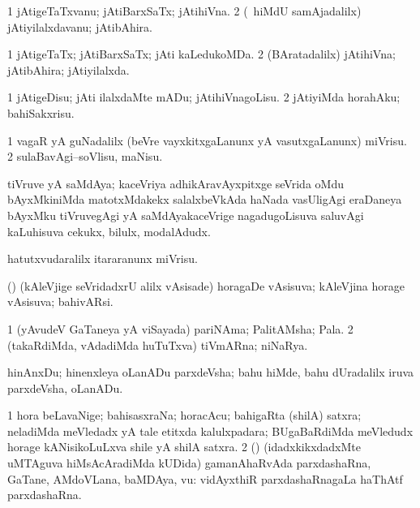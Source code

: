 \bentry
{}
\gl{\nA}
\bmng
\bnum
\num{1} jAtigeTaTxvanu; jAtiBarxSaTx; jAtihiVna. 
\num{2} (\kanmu\ hiMdU samAjadalilx) jAtiyilalxdavanu; jAtibAhira. 
\enum
\emng
\eentry

\bentry
{}
\gl{\gu}
\bmng
\bnum
\num{1} jAtigeTaTx; jAtiBarxSaTx; jAti kaLedukoMDa. 
\num{2} (BAratadalilx) jAtihiVna; jAtibAhira; jAtiyilalxda. 
\enum
\emng
\eentry

\bentry
{}
\gl{\sakirx}
\bmng
\bnum
\num{1} jAtigeDisu; jAti ilalxdaMte mADu; jAtihiVnagoLisu. 
\num{2} jAtiyiMda horahAku; bahiSakxrisu. 
\enum
\emng
\eentry

\bentry
{}
\gl{\sakirx}
\bmng
\bnum
\num{1} vagaR yA guNadalilx (beVre vayxkitxgaLanunx yA vasutxgaLanunx) miVrisu. 
\num{2} sulaBavAgi--soVlisu, maNisu. 
\enum
\emng
\eentry

\bentry
{}
\gl{\nA}
\bmng
tiVruve yA saMdAya; kaceVriya adhikAravAyxpitxge seVrida oMdu bAyxMkiniMda matotxMdakekx salalxbeVkAda haNada vasUligAgi eraDaneya bAyxMku tiVruvegAgi yA saMdAyakaceVrige nagadugoLisuva saluvAgi kaLuhisuva cekukx, bilulx, modalAdudx. 
\emng
\eentry

\bentry
{}
\gl{\sakirx}
\bmng
hatutxvudaralilx itararanunx miVrisu. 
\emng
\eentry

\bentry
{}
\gl{\gu}
\bmng
(\birx) (kAleVjige seVridadxrU alilx vAsisade) horagaDe vAsisuva; kAleVjina horage vAsisuva; bahivARsi. 
\emng
\eentry

\bentry
{}
\gl{\nA}
\bmng
\bnum
\num{1} (yAvudeV GaTaneya yA viSayada) pariNAma; PalitAMsha; Pala. 
\num{2} (takaRdiMda, vAdadiMda huTuTxva) tiVmARna; niNaRya. 
\enum
\emng
\eentry

\bentry
{}
\gl{\nA}
\bmng
hinAnxDu; hinenxleya oLanADu parxdeVsha; bahu hiMde, bahu dUradalilx iruva parxdeVsha, oLanADu. 
\emng
\eentry

\bentry
{}
\gl{\nA}
\bmng
\bnum
\num{1} hora beLavaNige; bahisasxraNa; horacAcu; bahigaRta (shilA) satxra; neladiMda meVledadx yA tale etitxda kalulxpadara; BUgaBaRdiMda meVledudx horage kANisikoLuLxva shile yA shilA satxra. 
\hypertarget{outcrop(1)2}{} 
\num{2} (\rUpa) (idadxkikxdadxMte uMTAguva hiMsAcAradiMda kUDida) gamanAhaRvAda parxdashaRna, GaTane, AMdoVLana, baMDAya, \mo vu:  vidAyxthiR parxdashaRnagaLa haThAtf parxdashaRna. 
\enum
\emng
\eentry


